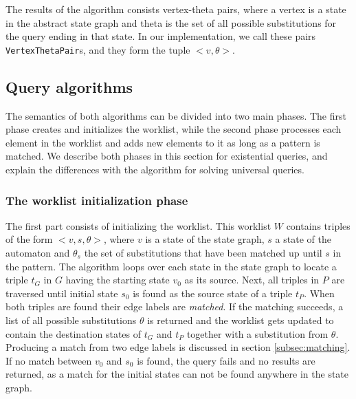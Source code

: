 The results of the algorithm consists vertex-theta pairs, where a vertex is a state in the abstract state graph and theta is the set of all possible substitutions for the query ending in that state. In our implementation, we call these pairs \texttt{VertexThetaPair}s, and they form the tuple $<v, \theta>$.

\subsection{Query algorithms}
\label{subsec:algorithms}

The semantics of both algorithms can be divided into two main phases. The first phase creates and initializes the worklist, while the second phase processes each element in the worklist and adds new elements to it as long as a pattern is matched. We describe both phases in this section for existential queries, and explain the differences with the algorithm for solving universal queries.


\subsubsection*{The worklist initialization phase}
 The first part consists of initializing the worklist. This worklist $W$ contains triples of the form $<v, s, \theta>$, where $v$ is a state of the state graph, $s$ a state of the automaton and $\theta_s$ the set of substitutions that have been matched up until $s$ in the pattern. The algorithm loops over each state in the state graph to locate a triple $t_G$ in $G$ having the starting state $v_0$ as its source. Next, all triples in $P$ are traversed until initial state $s_0$ is found as the source state of a triple $t_P$. When both triples are found their edge labels are \textit{matched}. If the matching succeeds, a list of all possible substitutions $\theta$ is returned and the worklist gets updated to contain the destination states of $t_G$ and $t_P$ together with a substitution from $\theta$. Producing a match from two edge labels is discussed in section \ref{subsec:matching}. If no match between $v_0$ and $s_0$ is found, the query fails and no results are returned, as a match for the initial states can not be found anywhere in the state graph.

